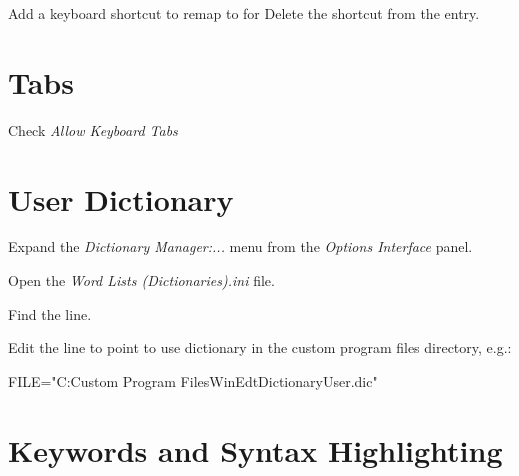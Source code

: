 \documentclass{lebook}
\begin{document}
Add a keyboard shortcut to remap  to  for 
Delete the  shortcut from the  entry.

\section{Tabs}
   \begin{numberedlist}
   	\item {}
   	\item Check \textit{Allow Keyboard Tabs}
   \end{numberedlist}

\section{User Dictionary}
\begin{numberedlist}
	\item Expand the \textit{Dictionary Manager:...} menu from the \textit{Options Interface} panel.
	\item Open the \textit{Word Lists (Dictionaries).ini} file.
	\item Find the  line.
	\item Edit the  line to point to use dictionary in the custom program files directory, e.g.:
	\begin{plainlist}
		\item FILE="C:\tbs{}Custom Program Files\tbs{}WinEdt\tbs{}Dictionary\tbs{}User.dic"
	\end{plainlist}
\end{numberedlist}

\section{Keywords and Syntax Highlighting}
\end{document}
